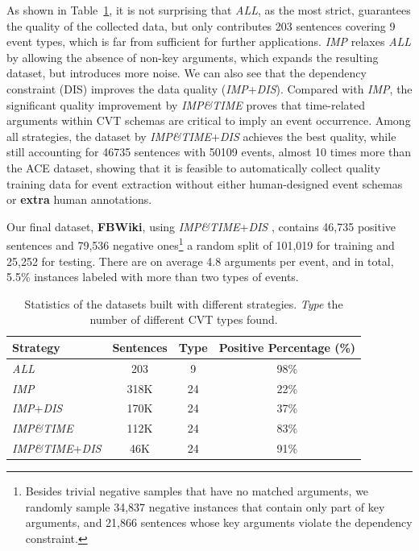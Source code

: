 As shown in Table~\ref{tab:3}, it is not surprising that \emph{ALL}, as the most strict, guarantees the quality of the collected data, but only contributes 203 sentences covering 9 event types, which is far from sufficient for further applications. \emph{IMP} relaxes \emph{ALL} by allowing the absence of non-key arguments, which expands the resulting dataset, but introduces more noise.
We can also see that the dependency constraint (DIS) improves the data quality (\emph{IMP}+\emph{DIS}).
Compared with \emph{IMP}, the significant quality improvement by \emph{IMP\&TIME} proves that time-related arguments within CVT schemas are critical to imply an event occurrence. Among all strategies, the dataset by \emph{IMP\&TIME}+\emph{DIS}  achieves the best quality, while still accounting for 46735 sentences with 50109 events, almost 10 times more than the ACE dataset, showing that it is feasible to automatically collect quality training data for event extraction without either human-designed event schemas or \textbf{extra} human annotations.

Our final dataset, \textbf{FBWiki}, using \emph{IMP\&TIME}+\emph{DIS} , contains 46,735 positive sentences and 79,536 negative ones\footnote{Besides trivial negative samples that have no matched arguments, we randomly sample 34,837 negative instances that contain only part of key arguments, and 21,866 sentences whose key arguments violate the dependency constraint.}
 a random split of 101,019 for
training and 25,252 for testing. There are on average 4.8 arguments per event, and in total, 5.5\% instances labeled with more than two
types of events.


\begin{table}[t!]
\scriptsize
\centering
\begin{tabular}{lccc}
     \toprule
	 \textbf{Strategy} & \textbf{Sentences} & \textbf{Type} & \textbf{Positive Percentage (\%)} \\
     \midrule
	 \rowcolor{Gray}\emph{ALL} & 203 & 9 & 98\% \\
	 \emph{IMP} & 318K & 24 & 22\% \\
	 \rowcolor{Gray} \emph{IMP}+\emph{DIS} & 170K & 24 & 37\% \\
	 \emph{IMP\&TIME} & 112K & 24 & 83\% \\
	 \rowcolor{Gray} \emph{IMP\&TIME}+\emph{DIS} & 46K & 24 & 91\% \\
     \bottomrule
\end{tabular}
\vspace{-2mm}
\caption{Statistics of the datasets built with different strategies.
\textit{Type} the number of different CVT types found.
\label{tab:3}}
\vspace{-3mm}
\end{table}


